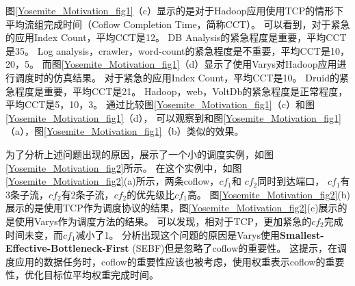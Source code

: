 图\ref{Yosemite_Motivation_fig1}（c）显示的是对于Hadoop应用使用TCP的情形下平均流组完成时间（Coflow Completion Time，简称CCT）。
可以看到，对于紧急的应用Index Count，平均CCT是12。
DB Analysis的紧急程度是重要，平均CCT是35。
Log analysis，crawler，word-count的紧急程度是不重要，平均CCT是10，20，5。
而图\ref{Yosemite_Motivation_fig1}（d）显示了使用Varys对Hadoop应用进行调度时的仿真结果。
对于紧急的应用Index Count，平均CCT是10。
Druid的紧急程度是重要，平均CCT是21。
Hadoop，web，VoltDb的紧急程度是正常程度，平均CCT是5，10，3。
通过比较图\ref{Yosemite_Motivation_fig1}（c）和图\ref{Yosemite_Motivation_fig1}（d），
可以观察到和图\ref{Yosemite_Motivation_fig1}（a），图\ref{Yosemite_Motivation_fig1}（b）类似的效果。

为了分析上述问题出现的原因，展示了一个小的调度实例，如图\ref{Yosemite_Motivation_fig2}所示。
在这个实例中，如图\ref{Yosemite_Motivation_fig2}(a)所示，两条coflow，$cf_1$和 $cf_2$同时到达端口，
$cf_1$有3条子流，$cf_2$有2条子流，$cf_2$的优先级比$cf_1$高。
图\ref{Yosemite_Motivation_fig2}(b)展示的是使用TCP作为调度协议的结果，图\ref{Yosemite_Motivation_fig2}(c)展示的是使用Varys作为调度方法的结果。
可以发现，相对于TCP，更加紧急的$cf_2$完成时间未变，而$cf_1$减小了1。
分析出现这个问题的原因是Varys使用\textbf{Smallest-Effective-Bottleneck-First }(SEBF)但是忽略了coflow的重要性。
这提示，在调度应用的数据任务时，coflow的重要性应该也被考虑，使用权重表示coflow的重要性，优化目标位平均权重完成时间。


